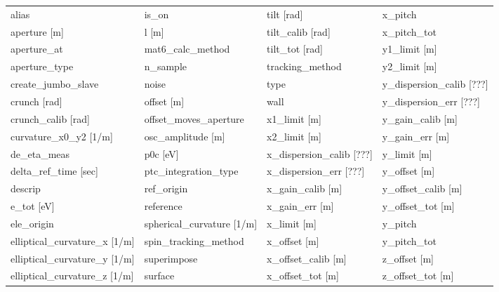  \begin{tabular}{llll} \toprule
alias                            & is_on                            & tilt [rad]                       & x_pitch                          \\
aperture [m]                     & l [m]                            & tilt_calib [rad]                 & x_pitch_tot                      \\
aperture_at                      & mat6_calc_method                 & tilt_tot [rad]                   & y1_limit [m]                     \\
aperture_type                    & n_sample                         & tracking_method                  & y2_limit [m]                     \\
create_jumbo_slave               & noise                            & type                             & y_dispersion_calib [???]         \\
crunch [rad]                     & offset [m]                       & wall                             & y_dispersion_err [???]           \\
crunch_calib [rad]               & offset_moves_aperture            & x1_limit [m]                     & y_gain_calib [m]                 \\
curvature_x0_y2 [1/m]            & osc_amplitude [m]                & x2_limit [m]                     & y_gain_err [m]                   \\
de_eta_meas                      & p0c [eV]                         & x_dispersion_calib [???]         & y_limit [m]                      \\
delta_ref_time [sec]             & ptc_integration_type             & x_dispersion_err [???]           & y_offset [m]                     \\
descrip                          & ref_origin                       & x_gain_calib [m]                 & y_offset_calib [m]               \\
e_tot [eV]                       & reference                        & x_gain_err [m]                   & y_offset_tot [m]                 \\
ele_origin                       & spherical_curvature [1/m]        & x_limit [m]                      & y_pitch                          \\
elliptical_curvature_x [1/m]     & spin_tracking_method             & x_offset [m]                     & y_pitch_tot                      \\
elliptical_curvature_y [1/m]     & superimpose                      & x_offset_calib [m]               & z_offset [m]                     \\
elliptical_curvature_z [1/m]     & surface                          & x_offset_tot [m]                 & z_offset_tot [m]                 \\
 \bottomrule
 \end{tabular}
 \vfill
 
